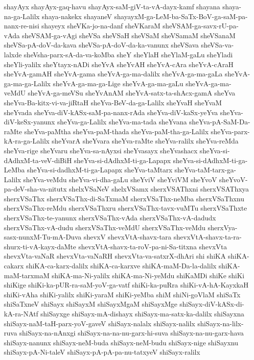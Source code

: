 {shayAyx
shayAyx-gaq-havu
shayAyx-saM-giV-ta-vA-dayx-kamf
shayana
shaya-na-ga-Lalilx
shaya-nakekx
shayaneV
shayayxM-ga-LeM-ba-SaTx-BoV-ga-saM-pa-nanx-re-nisi
shayeyx
sheVKa-jo-na-danf
sheVKaraM
sheVSAM-ga-savx-rU-pa-vAda
sheVSAM-ga-vAgi
sheVSa
sheVSaH
sheVSaM
sheVSamaM
sheVSanaM
sheVSa-pA-doV-da-kava
sheVSa-pA-doV-da-ka-vanunx
sheVSava
sheVSa-va-lalxde
sheVsha-parx-sA-da-va-koMba
sheY
sheYlaH
sheYlaM-gaLu
sheYladi
sheYli-yalilx
sheYtayx-nADi
sheYvA
sheYvAH
sheYvA-cAra
sheYvA-cAraH
sheYvA-gamAH
sheYvA-gama
sheYvA-ga-ma-dalilx
sheYvA-ga-ma-gaLa
sheYvA-ga-ma-ga-Lalilx
sheYvA-ga-ma-ga-Lige
sheYvA-ga-ma-gaLu
sheYvA-ga-ma-veMdU
sheYvA-ga-meVSu
sheYvAnAM
sheYvA-satx-ta-shAcx-gamA
sheYva
sheYva-Ba-kitx-vi-va-jiRtaH
sheYva-BeV-da-ga-Lalilx
sheYvaH
sheYvaM
sheYvada
sheYva-diV-kASx-saM-pa-nanx-rAda
sheYva-diV-kaSx-yeYva
sheYva-diV-keSx-yanunx
sheYva-ga-Lalilx
sheYva-ma-tada
sheYvana
sheYva-pA-SaM-Da-raMte
sheYva-paMtha
sheYva-paM-thada
sheYva-paM-tha-ga-Lalilx
sheYva-parx-kA-ra-ga-Lalilx
sheYvarA
sheYvara
sheYva-raMte
sheYva-ralilx
sheYva-reMda
sheYva-rige
sheYvaru
sheYva-sa-nAyxsi
sheYvasayx
sheYvashacx
sheYva-si-dAdhxM-ta-veV-diBiH
sheYva-si-dAdhxM-ti-ga-Lapapx
sheYva-si-dAdhxM-ti-ga-LeMba
sheYva-si-dadhxM-ti-ga-Lapapx
sheYva-taMtarx
sheYva-taM-tarx-ga-Lalilx
sheYva-veMdu
sheYva-vi-dha-gaLu
sheYviV
sheYviVM
sheYvoV
sheYvoV-pa-deV-sha-va-nitutx
shelxVSaNeV
shelxVSamx
sherxVSAThxni
sherxVSAThxya
sherxVSaThx
sherxVSaThx-di-SaTxmaM
sherxVSaThx-neMba
sherxVSaThxnu
sherxVSaThx-reMdu
sherxVSaThxru
sherxVSaThx-tavx-vuMTu
sherxVSaThxte
sherxVSaThx-te-yanunx
sherxVSaThx-vAda
sherxVSaThx-vA-dadudx
sherxVSaThx-vA-dudu
sherxVSaThx-veMdU
sherxVSaThx-veMdu
sherxVya-sasx-nunxM-Tu-mA-Duva
shevxV
shevxVtA-shavx-tara
shevxVtA-shavx-ta-ra-shurx-ti-vA-kayx-daMte
shevxVtA-shavx-ta-roV-pa-ni-Sa-titxna
shevxVta
shevxVta-vaNaR
shevxVta-vaNaRH
shevxVta-va-satxrX-dhAri
shi
shiKA
shiKA-cakarx
shiKA-ca-karx-dalilx
shiKA-ca-karxve
shiKA-maM-Da-la-dalilx
shiKA-maM-tarxmaM
shiKA-ma-Ni-yalilx
shiKA-ma-Ni-yeMdu
shiKaMDi
shiKe
shiKi
shiKige
shiKi-ka-pUR-ra-saM-yoV-ga-vatf
shiKi-ka-puRra
shiKi-vA-hA-KayxkaH
shiKi-vAha
shiKi-yalilx
shiKi-yaraM
shiKi-yeMba
shiM
shiNi-goVlaM
shiSaTx
shiSaTxneV
shiSayx
shiSayxM
shiSayxMgaM
shiSayxMge
shiSayx-diV-kASx-di-kA-ra-NAtf
shiSayxge
shiSayx-mA-dishayx
shiSayx-ma-satx-ka-dalilx
shiSayxna
shiSayx-naM-taH-parx-yoV-gaveV
shiSayx-nalalx
shiSayx-nalilx
shiSayx-na-lilx-ruva
shiSayx-na-nAnxgi
shiSayx-na-na-nu-garx-hi-suva
shiSayx-na-nu-garx-hava
shiSayx-nanunx
shiSayx-neM-buda
shiSayx-neM-budu
shiSayx-nige
shiSayxnu
shiSayx-pA-Ni-taleV
shiSayx-pA-pA-pa-nu-tatxyeV
shiSayx-ralilx
}
